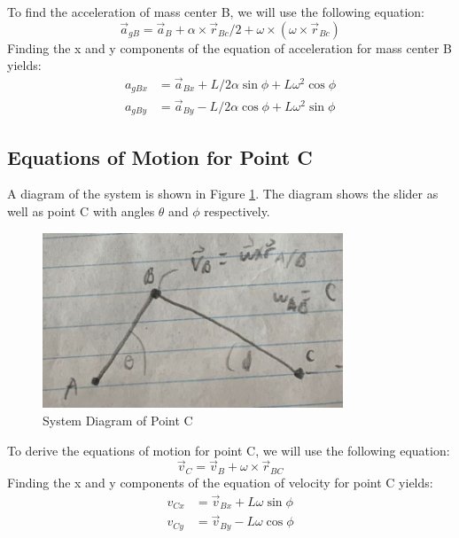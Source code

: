 \documentclass[12pt, titlepage]{article}
\begin{document}
To find the acceleration of mass center B, we will use the following equation:
\begin{equation}
    \label{eq:accbcenter}
    \vec{a}_{gB} = \vec{a}_B + \alpha \times \vec{r}_{Bc}/2 +
      \omega \times (\omega \times \vec{r}_{Bc})
\end{equation}
Finding the x and y components of the equation of acceleration for mass center
B yields:
\begin{equation}
    \label{eq:accbcenterxy}
    \begin{split}
        a_{gBx} &= \vec{a}_{Bx} + L/2\alpha\sin\phi + L\omega^2\cos\phi\\
        a_{gBy} &= \vec{a}_{By} - L/2\alpha\cos\phi + L\omega^2\sin\phi
    \end{split}
\end{equation}
\subsection{Equations of Motion for Point C}
A diagram of the system is shown in Figure \ref{fig:systemC}. The diagram
shows the slider as well as point C with angles $\theta$ and $\phi$
respectively.
\begin{figure}[H]
    \centering
    \includegraphics[width=0.8\textwidth]{./Images/f3.png}
    \caption{System Diagram of Point C}
    \label{fig:systemC}
\end{figure}
To derive the equations of motion for point C, we will use the following
equation:
\begin{equation}
    \label{eq:velc}
    \vec{v}_C = \vec{v}_B + \omega \times \vec{r}_{BC}
\end{equation}
Finding the x and y components of the equation of velocity for point C yields:
\begin{equation}
    \label{eq:velcxy}
    \begin{split}
        v_{Cx} &= \vec{v}_{Bx} + L\omega\sin\phi\\
        v_{Cy} &= \vec{v}_{By} - L\omega\cos\phi
    \end{split}
\end{equation}
\end{document}
